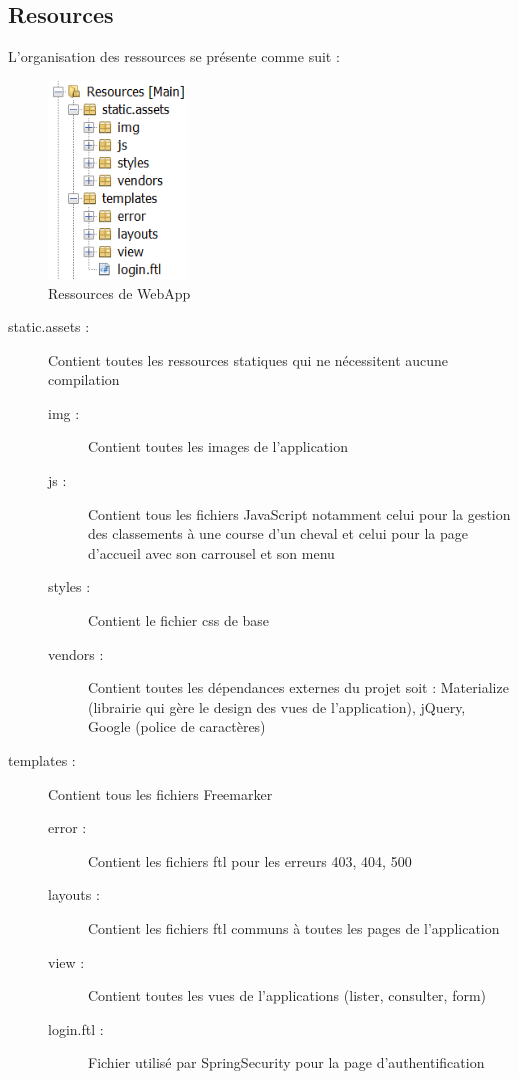 		\subsection{Resources}


			L'organisation des ressources se présente comme suit :

			\begin{figure}[H]
				\centering\includegraphics[width=0.33\textwidth, keepaspectratio]{res/ressources.png}
				\caption{Ressources de WebApp}
			\end{figure}

			\begin{description}
				\item[static.assets :]{Contient toutes les ressources statiques qui ne nécessitent aucune compilation}
				\begin{description}
					\item[img :]{Contient toutes les images de l'application}
					\item[js :]{Contient tous les fichiers JavaScript notamment celui pour la gestion des classements à une course d'un cheval et celui pour la page d'accueil avec son carrousel et son menu}
					\item[styles :]{Contient le fichier css de base}
					\item[vendors :]{Contient toutes les dépendances externes du projet soit : Materialize (librairie qui gère le design des vues de l'application), jQuery, Google (police de caractères)}
				\end{description}

				\item[templates :]{Contient tous les fichiers Freemarker}
				\begin{description}
					\item[error :]{Contient les fichiers ftl pour les erreurs 403, 404, 500}
					\item[layouts :]{Contient les fichiers ftl communs à toutes les pages de l'application}
					\item[view :]{Contient toutes les vues de l'applications (lister, consulter, form)}
					\item[login.ftl :]{Fichier utilisé par SpringSecurity pour la page d'authentification}
				\end{description}
			\end{description}

